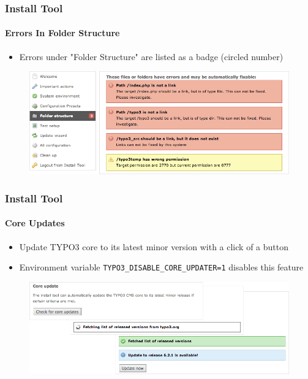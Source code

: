 
\begin{frame}[fragile]
	\frametitle{Install Tool}
	\framesubtitle{Errors In Folder Structure}

	\begin{itemize}
		\item Errors under "Folder Structure" are listed as a badge (circled number)
	\end{itemize}

	\begin{figure}
		\includegraphics[width=0.95\linewidth]{Images/InstallTool/ErrorsInFolderStructure.png}
	\end{figure}

\end{frame}


\begin{frame}[fragile]
	\frametitle{Install Tool}
	\framesubtitle{Core Updates}

	\begin{itemize}
		\item Update TYPO3 core to its latest minor version with a click of a button 
		\item Environment variable \texttt{TYPO3\_DISABLE\_CORE\_UPDATER=1} disables this feature
	\end{itemize}

	\begin{figure}
		\includegraphics[width=0.95\linewidth]{Images/InstallTool/CoreUpdate.png}
	\end{figure}

\end{frame}

